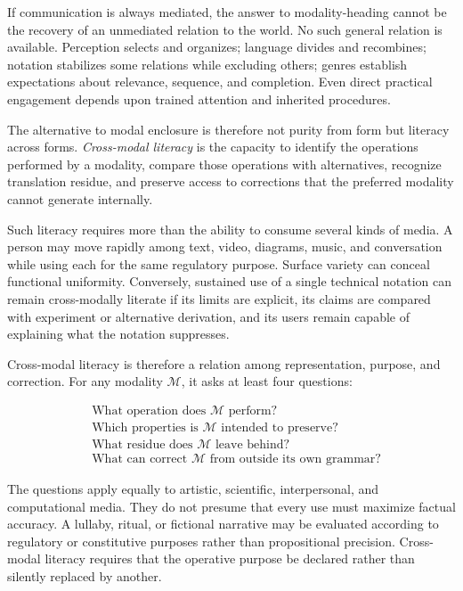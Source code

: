 \documentclass[11pt]{article}
\newcommand{\term}[1]{\emph{#1}}
\newcommand{\modality}{\mathcal{M}}
\begin{document}
If communication is always mediated, the answer to modality-heading cannot be
the recovery of an unmediated relation to the world. No such general relation
is available. Perception selects and organizes; language divides and
recombines; notation stabilizes some relations while excluding others; genres
establish expectations about relevance, sequence, and completion. Even direct
practical engagement depends upon trained attention and inherited procedures.

The alternative to modal enclosure is therefore not purity from form but
literacy across forms. \term{Cross-modal literacy} is the capacity to identify
the operations performed by a modality, compare those operations with
alternatives, recognize translation residue, and preserve access to
corrections that the preferred modality cannot generate internally.

Such literacy requires more than the ability to consume several kinds of
media. A person may move rapidly among text, video, diagrams, music, and
conversation while using each for the same regulatory purpose. Surface
variety can conceal functional uniformity. Conversely, sustained use of a
single technical notation can remain cross-modally literate if its limits are
explicit, its claims are compared with experiment or alternative derivation,
and its users remain capable of explaining what the notation suppresses.

Cross-modal literacy is therefore a relation among representation, purpose,
and correction. For any modality \(\modality\), it asks at least four
questions:

\begin{equation}
  \begin{aligned}
    &\text{What operation does }\modality\text{ perform?}\\
    &\text{Which properties is }\modality\text{ intended to preserve?}\\
    &\text{What residue does }\modality\text{ leave behind?}\\
    &\text{What can correct }\modality\text{ from outside its own grammar?}
  \end{aligned}
  \label{eq:cross-modal-questions}
\end{equation}

The questions apply equally to artistic, scientific, interpersonal, and
computational media. They do not presume that every use must maximize factual
accuracy. A lullaby, ritual, or fictional narrative may be evaluated according
to regulatory or constitutive purposes rather than propositional precision.
Cross-modal literacy requires that the operative purpose be declared rather
than silently replaced by another.
\end{document}
